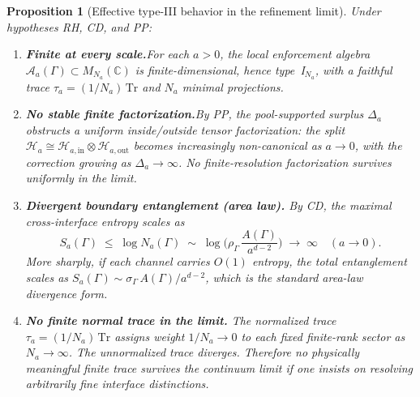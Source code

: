 \documentclass[11pt,a4paper]{article}
\newtheorem{proposition}[theorem]{Proposition}
\theoremstyle{definition}
\begin{document}
\begin{proposition}[Effective type-III behavior in the refinement
limit]\label{prop:effective_typeIII}
Under hypotheses RH, CD, and PP:
\begin{enumerate}[label=(\roman*),nosep]
  \item \textbf{Finite at every scale.}\quad For each $a > 0$, the
  local enforcement algebra $\mathcal{A}_a(\Gamma) \subset
  M_{N_a}(\mathbb{C})$ is finite-dimensional, hence type~I$_{N_a}$,
  with a faithful trace $\tau_a = (1/N_a)\,\mathrm{Tr}$ and $N_a$
  minimal projections.
  \item \textbf{No stable finite factorization.}\quad By PP, the
  pool-supported surplus $\Delta_a$ obstructs a uniform
  inside/outside tensor factorization: the split
  $\mathcal{H}_a \cong \mathcal{H}_{a,\mathrm{in}} \otimes
  \mathcal{H}_{a,\mathrm{out}}$ becomes increasingly non-canonical
  as $a \to 0$, with the correction growing as $\Delta_a \to \infty$.
  No finite-resolution factorization survives uniformly in the limit.
  \item \textbf{Divergent boundary entanglement (area law).}\quad
  By CD, the maximal cross-interface entropy scales as
  \begin{equation}\label{eq:area_law}
    S_a(\Gamma) \;\le\; \log N_a(\Gamma)
    \;\sim\; \log\!\Big(\rho_\Gamma\,\frac{A(\Gamma)}{a^{d-2}}\Big)
    \;\to\; \infty \quad (a \to 0).
  \end{equation}
  More sharply, if each channel carries $O(1)$ entropy, the total
  entanglement scales as
  $S_a(\Gamma) \sim \sigma_\Gamma\, A(\Gamma) / a^{d-2}$, which is
  the standard area-law divergence form.
  \item \textbf{No finite normal trace in the limit.}\quad
  The normalized trace $\tau_a = (1/N_a)\,\mathrm{Tr}$ assigns
  weight $1/N_a \to 0$ to each fixed finite-rank sector as
  $N_a \to \infty$.  The unnormalized trace diverges.  Therefore no
  physically meaningful finite trace survives the continuum limit
  if one insists on resolving arbitrarily fine interface distinctions.
\end{enumerate}
\end{proposition}
\end{document}
